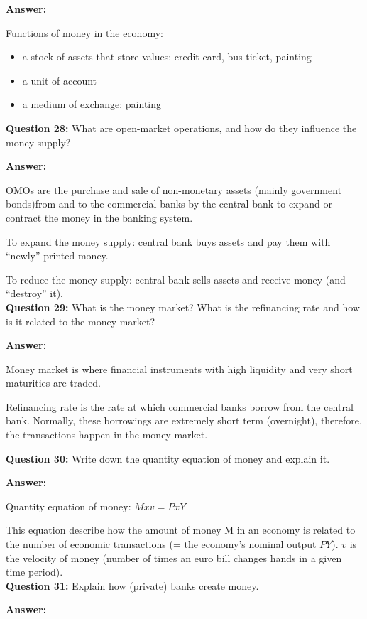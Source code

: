 \documentclass[a4paper, 11pt]{article}
\begin{document}
\textbf{Answer:} 

Functions of money in the economy:
\begin{itemize}
\item a stock of assets that store values: credit card, bus ticket, painting
\item a unit of account
\item a medium of exchange: painting
\end{itemize}

\textbf{Question 28:} What are open-market operations, and how do they influence the money supply?

\textbf{Answer:} 

OMOs are the purchase and sale of non-monetary assets (mainly government bonds)from and to the commercial banks by the central bank to expand or contract the money in the banking system.

To expand the money supply: central bank buys assets and pay them with ``newly'' printed money.

To reduce the money supply: central bank sells assets and receive money (and ``destroy'' it). \\

\textbf{Question 29:} What is the money market? What is the refinancing rate and how is it related to the money market?

\textbf{Answer:} 

Money market is where financial instruments with high liquidity and very short maturities are traded.

Refinancing rate is the rate at which commercial banks borrow from the central bank. Normally, these borrowings are extremely short term (overnight), therefore, the transactions happen in the money market.

\textbf{Question 30:} Write down the quantity equation of money and explain it.

\textbf{Answer:} 

Quantity equation of money: $M x v = P x Y$

This equation describe how the amount of money M in an economy is related to the number of economic transactions (= the economy's nominal output $PY$). $v$ is the velocity of money (number of times an euro bill changes hands in a given time period). \\

\textbf{Question 31:} Explain how (private) banks create money.

\textbf{Answer:} 
\end{document}
